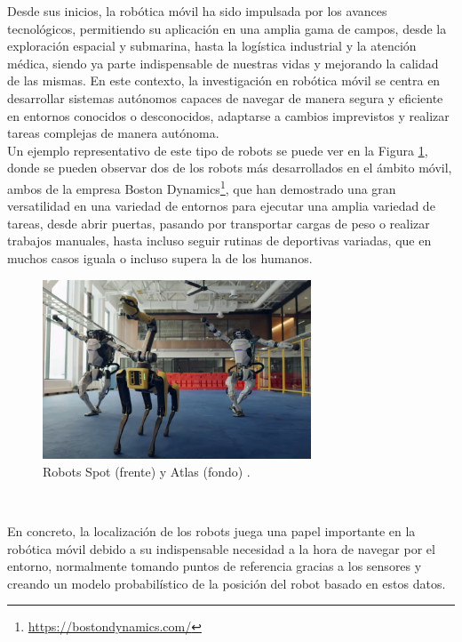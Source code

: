 Desde sus inicios, la robótica móvil ha sido impulsada por los avances
tecnológicos, permitiendo su aplicación en una amplia gama de campos, desde la
exploración espacial y submarina, hasta la logística industrial y la atención
médica, siendo ya parte indispensable de nuestras vidas y mejorando la calidad
de las mismas.
En este contexto, la investigación en robótica móvil se centra en desarrollar
sistemas autónomos capaces de navegar de manera segura y eficiente en entornos
conocidos o desconocidos, adaptarse a cambios imprevistos y realizar tareas
complejas de manera autónoma.
\\

Un ejemplo representativo de este tipo de robots se puede ver en la Figura
\ref{fig:boston_dynamics}, donde se pueden observar dos de los robots más
desarrollados en el ámbito móvil, ambos de la empresa Boston
Dynamics\footnote{\url{https://bostondynamics.com/}}, que han demostrado una
gran versatilidad en una variedad de entornos para ejecutar una amplia variedad
de tareas, desde abrir puertas, pasando por transportar cargas de peso o
realizar trabajos manuales, hasta incluso seguir rutinas de deportivas variadas,
que en muchos casos iguala o incluso supera la de los humanos.

\begin{figure} [h!]
  \begin{center}
    \includegraphics[width=8cm]{figs/atlas_spot_robots}
  \end{center}
  \caption{Robots Spot (frente) y Atlas (fondo) \citep{atlas_spot}.}
  \label{fig:boston_dynamics}
\end{figure}\

En concreto, la localización de los robots juega una papel importante en la
robótica móvil debido a su indispensable necesidad a la hora de navegar por el
entorno, normalmente tomando puntos de referencia gracias a los sensores y
creando un modelo probabilístico de la posición del robot basado en estos datos.
\\

